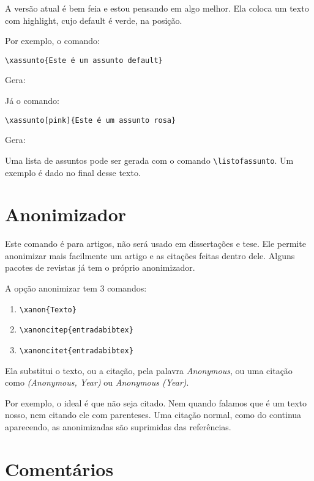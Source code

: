 \documentclass{article}
\begin{document}
A versão atual é bem feia e estou pensando em algo melhor. Ela coloca um texto com highlight, cujo default é verde, na posição.

Por exemplo, o comando:
\begin{verbatim}
\xassunto{Este é um assunto default}    
\end{verbatim}

Gera:


Já o comando:
\begin{verbatim}
\xassunto[pink]{Este é um assunto rosa}   
\end{verbatim}

Gera:


Uma lista de assuntos pode ser gerada com o comando
\verb!\listofassunto!. Um exemplo é dado no final desse texto.

\section{Anonimizador}

Este comando é para artigos, não será usado em dissertações e tese. Ele permite anonimizar mais facilmente um artigo e as citações feitas dentro dele. Alguns pacotes de revistas já tem o próprio anonimizador.

A opção anonimizar tem 3 comandos:
\begin{enumerate}
    \item \verb!\xanon{Texto}!
    \item \verb!\xanoncitep{entradabibtex}!
    \item \verb!\xanoncitet{entradabibtex}!
\end{enumerate}

Ela substitui o texto, ou a citação, pela palavra \textit{Anonymous}, ou uma citação como \textit{(Anonymous, Year)} ou \textit{Anonymous (Year)}.

Por exemplo, o ideal é que  não seja citado. Nem quando falamos que  é um texto nosso, nem citando ele com parenteses. Uma citação normal, como do \citet{Juran2010} continua aparecendo, as anonimizadas são suprimidas das referências.

\section{Comentários}
\end{document}
